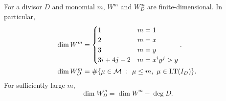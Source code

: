 \begin{theorem}
  \label{thm_dim_W}
  For a divisor $D$ and monomial $m$, $W^m$ and $W_D^m$ are finite-dimensional.
  In particular,
  \begin{align*}
    \dim W^m &= \begin{cases}
                  1 & m = 1 \\
                  2 & m = x \\
                  3 & m = y \\
                  3i + 4j - 2 & m = x^iy^j > y
                \end{cases}. \\
    \dim W_D^m &= \# \{ \mu \in \mathcal{M} ~:~ \mu \leq m, ~\mu \in \operatorname{LT}(I_D) \}.
  \end{align*}
  For sufficiently large $m$,
  \[ \dim W_D^m = \dim W^m - \deg D.\]
\end{theorem}
